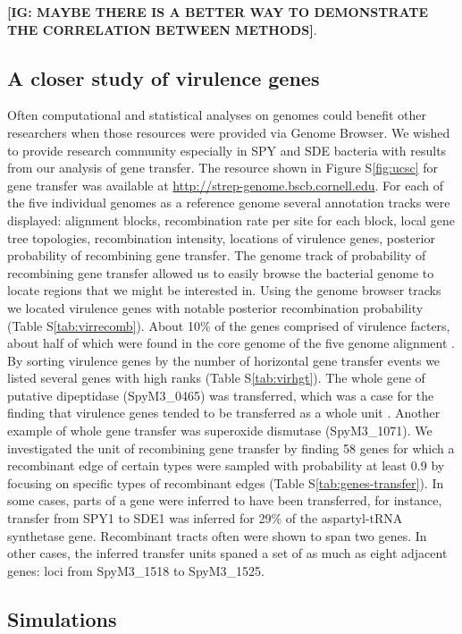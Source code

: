 \documentclass[10pt]{article}
\let\citep\cite
\begin{document}
{\bf [IG: MAYBE THERE IS A BETTER WAY TO DEMONSTRATE THE CORRELATION BETWEEN METHODS]}.

\subsection*{A closer study of virulence genes}

Often computational and statistical analyses on genomes could benefit other
researchers when those resources were provided via Genome Browser.  We wished to
provide research community especially in SPY and SDE bacteria with results from
our analysis of gene transfer.  The resource shown in Figure S\ref{fig:ucsc} for
gene transfer was available at \url{http://strep-genome.bscb.cornell.edu}.  For
each of the five individual genomes as a reference genome several annotation
tracks were displayed: alignment blocks, recombination rate per site for each
block, local gene tree topologies, recombination intensity, locations of
virulence genes, posterior probability of recombining gene transfer. The genome
track of probability of recombining gene transfer allowed us to easily browse
the bacterial genome to locate regions that we might be interested in.  Using
the genome browser tracks we located virulence genes with notable posterior
recombination probability (Table S\ref{tab:virrecomb}).  About 10\% of the genes
comprised of virulence facters, about half of which were found in the core
genome of the five genome alignment \citep{Suzuki2011}.  By sorting virulence
genes by the number of horizontal gene transfer events we listed several genes
with high ranks (Table S\ref{tab:virhgt}).
The whole gene of  putative dipeptidase (SpyM3\_0465) was transferred, which was
a case for the finding that virulence genes tended to be transferred as a whole
unit \citep{Chan2009}.  Another example of whole gene transfer was superoxide
dismutase (SpyM3\_1071).  We investigated the unit of recombining gene transfer
by finding 58 genes for which a recombinant edge of certain types were sampled
with probability at least 0.9 by focusing on specific types of recombinant edges
(Table S\ref{tab:genes-transfer}).  In some cases, parts of a gene were inferred
to have been transferred, for instance, transfer from SPY1 to SDE1 was inferred
for 29\% of the aspartyl-tRNA synthetase gene. Recombinant tracts often were
shown to span two genes.  In other cases, the inferred transfer units spaned a
set of as much as eight adjacent genes: loci from SpyM3\_1518 to SpyM3\_1525.

\subsection*{Simulations}
\end{document}
